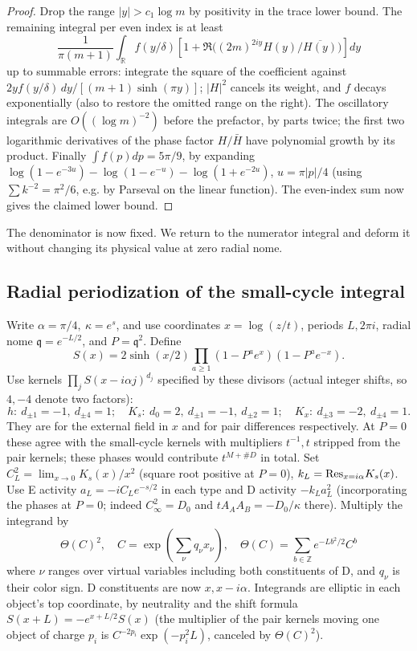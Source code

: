 \begin{proof}
Drop the range \(|y|>c_1\log m\) by positivity in the trace lower bound. The remaining integral per even index is at least
\[
 \frac{1}{\pi(m+1)}\int_{\mathbb R} f(y/\delta)
 \left[1+\Re\big((2m)^{2iy}H(y)/\overline{H(y)}\big)\right]dy
\]
up to summable errors: integrate the square of the coefficient against \(2y f(y/\delta)\,dy/[(m+1)\sinh(\pi y)]\); \(|H|^2\) cancels its weight, and \(f\) decays exponentially (also to restore the omitted range on the right). The oscillatory integrals are \(O((\log m)^{-2})\) before the prefactor, by parts twice; the first two logarithmic derivatives of the phase factor \(H/\bar H\) have polynomial growth by its product. Finally \(\int f(p)dp=5\pi/9\), by expanding \(\log(1-e^{-3u})-\log(1-e^{-u})-\log(1+e^{-2u})\), \(u=\pi|p|/4\) (using \(\sum k^{-2}=\pi^2/6\), e.g. by Parseval on the linear function). The even-index sum now gives the claimed lower bound.

\end{proof}

The denominator is now fixed. We return to the numerator integral and deform it without changing its physical value at zero radial nome.

\subsection{Radial periodization of the small-cycle integral}\label{c01-c1-radial-periodization-of-the-small-cycle-integral}

Write \(\alpha=\pi/4,\ \kappa=e^s\), and use coordinates \(x=\log(z/t)\), periods \(L,2\pi i\), radial nome \(\mathfrak q=e^{-L/2}\), and \(P=\mathfrak q^2\). Define
\[
 S(x)=2\sinh(x/2)\prod_{a\ge1}(1-P^a e^x)(1-P^a e^{-x}).
\]
Use kernels \(\prod_j S(x-i\alpha j)^{d_j}\) specified by these divisors (actual integer shifts, so \(4,-4\) denote two factors):
\[
 h:\ d_{\pm1}=-1,\ d_{\pm4}=1;\quad
 K_s:\ d_0=2,\ d_{\pm1}=-1,\ d_{\pm2}=1;\quad
 K_x:\ d_{\pm3}=-2,\ d_{\pm4}=1.
\]
They are for the external field in \(x\) and for pair differences respectively. At \(P=0\) these agree with the small-cycle kernels with multipliers \(t^{-1},t\) stripped from the pair kernels; these phases would contribute \(t^{M+\#D}\) in total. Set \(C_L^2=\lim_{x\to0}K_s(x)/x^2\) (square root positive at \(P=0\)), \(k_L={\rm Res}_{x=i\alpha}K_s(x)\). Use E activity \(a_L=-i C_L e^{-s/2}\) in each type and D activity \(-k_L a_L^2\) (incorporating the phases at \(P=0\); indeed \(C_\infty^2=D_0\) and \(t A_A A_B=-D_0/\kappa\) there). Multiply the integrand by
\[
 \Theta(C)^2,\quad C=\exp(\sum_\nu q_\nu x_\nu),\quad
 \Theta(C)=\sum_{b\in\mathbb Z} e^{-Lb^2/2} C^b
\]
where \(\nu\) ranges over virtual variables including both constituents of D, and \(q_\nu\) is their color sign. D constituents are now \(x,x-i\alpha\). Integrands are elliptic in each object's top coordinate, by neutrality and the shift formula \(S(x+L)=-e^{x+L/2}S(x)\) (the multiplier of the pair kernels moving one object of charge \(p_i\) is \(C^{-2p_i}\exp(-p_i^2L)\), canceled by \(\Theta(C)^2\)).

